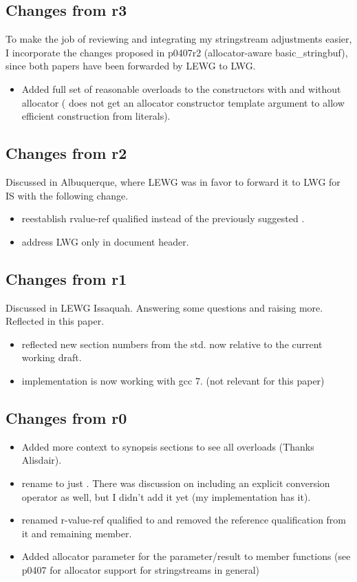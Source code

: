 \documentclass[ebook,11pt,article]{memoir}
\begin{document}
\subsection{Changes from r3}
To make the job of reviewing and integrating my stringstream adjustments easier, I incorporate the changes proposed in p0407r2 (allocator-aware basic\_stringbuf), since both papers have been forwarded by LEWG to LWG.
\begin{itemize}
\item Added full set of reasonable overloads to the constructors with and without allocator ( does not get an allocator constructor template argument to allow efficient construction from  literals).
\end{itemize}


\subsection{Changes from r2}
Discussed in Albuquerque, where LEWG was in favor to forward it to LWG for IS with the following change.
\begin{itemize}
\item reestablish rvalue-ref qualified  instead of the previously suggested .
\item address LWG only in document header.
\end{itemize}


\subsection{Changes from r1}
Discussed in LEWG Issaquah. Answering some questions and raising more. Reflected in this paper.
\begin{itemize}
\item reflected new section numbers from the std. now relative to the current working draft.
\item implementation is now working with gcc 7. (not relevant for this paper)
\end{itemize}

\subsection{Changes from r0}
\begin{itemize}
\item Added more context to synopsis sections to see all overloads (Thanks Alisdair).
\item rename  to just . There was discussion on including an explicit conversion operator as well, but I didn't add it yet (my implementation has it).
\item renamed r-value-ref qualified  to  and removed the reference qualification from it and remaining  member.
\item Added allocator parameter for the  parameter/result to member functions (see p0407 for allocator support for stringstreams in general)
\end{itemize}
\end{document}
